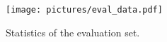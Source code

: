 
\begin{figure}[tb]
\begin{center}
\centerline{\texttt{[image: pictures/eval\_data.pdf]}}
\caption{Statistics of the evaluation set.}
\label{eval_data}
\end{center}
\vskip -0.4in
\end{figure}